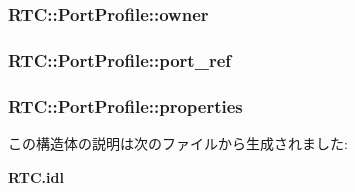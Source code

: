 \subsubsection[{owner}]{ {\bf RTC::PortProfile::owner}}\label{structRTC_1_1PortProfile_a91b5c831f6c0dff96d0aa69d7cd84392}
\subsubsection[{port\_\-ref}]{ {\bf RTC::PortProfile::port\_\-ref}}\label{structRTC_1_1PortProfile_aa0ed1c408a064f19080bc0a21a96bc43}
\subsubsection[{properties}]{ {\bf RTC::PortProfile::properties}}\label{structRTC_1_1PortProfile_aa9b72d4c51a62eab04ac2c701e39eaeb}


この構造体の説明は次のファイルから生成されました:\begin{DoxyCompactItemize}
\item 
{\bf RTC.idl}\end{DoxyCompactItemize}
